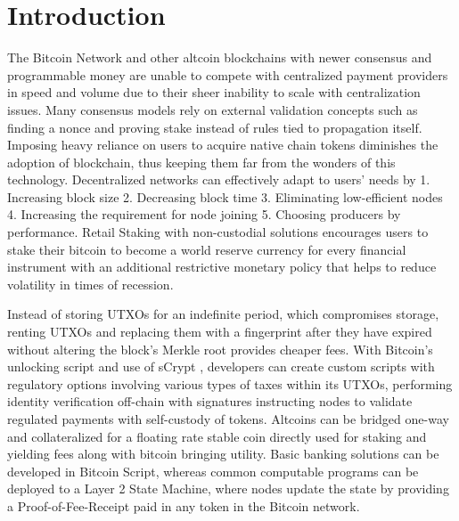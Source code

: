 \documentclass[../Bitcoin Blink.tex]{subfiles}
\begin{document}
\section{Introduction}
The Bitcoin Network \cite{nakamoto2008bitcoin} and other altcoin blockchains with newer consensus and programmable money are unable to compete with centralized payment providers in speed and volume due to their sheer inability to scale with centralization issues. Many consensus models rely on external validation concepts such as finding a nonce and proving stake instead of rules tied to propagation itself. Imposing heavy reliance on users to acquire native chain tokens diminishes the adoption of blockchain, thus keeping them far from the wonders of this technology. Decentralized networks can effectively adapt to users’ needs by 1. Increasing block size 2. Decreasing block time 3. Eliminating low-efficient nodes 4. Increasing the requirement for node joining 5. Choosing producers by performance. Retail Staking with non-custodial solutions encourages users to stake their bitcoin to become a world reserve currency for every financial instrument with an additional restrictive monetary policy that helps to reduce volatility in times of recession.

Instead of storing UTXOs for an indefinite period, which compromises storage, renting UTXOs and replacing them with a fingerprint after they have expired without altering the block’s Merkle root provides cheaper fees. With Bitcoin’s unlocking script and use of sCrypt \cite{sCrypt}, developers can create custom scripts with regulatory options involving various types of taxes within its UTXOs, performing identity verification off-chain with signatures instructing nodes to validate regulated payments with self-custody of tokens. Altcoins can be bridged one-way and collateralized for a floating rate stable coin directly used for staking and yielding fees along with bitcoin bringing utility. Basic banking solutions can be developed in Bitcoin Script, whereas common computable programs can be deployed to a Layer 2 State Machine, where nodes update the state by providing a Proof-of-Fee-Receipt paid in any token in the Bitcoin network.
\end{document}
